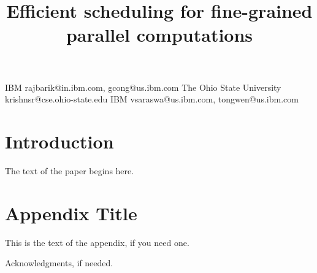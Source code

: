 \documentclass[preprint]{sigplanconf}
\begin{document}
\copyrightdata{[to be supplied]} 


\title{Efficient scheduling for fine-grained parallel computations}

           {IBM}
           {rajbarik@in.ibm.com, gcong@us.ibm.com}
           {The Ohio State University}
           {krishnsr@cse.ohio-state.edu}
           {IBM}
           {vsaraswa@us.ibm.com, tongwen@us.ibm.com}

\maketitle

\begin{abstract}

\end{abstract}




\section{Introduction}

The text of the paper begins here.

\appendix
\section{Appendix Title}

This is the text of the appendix, if you need one.

\acks

Acknowledgments, if needed.



\end{document}
